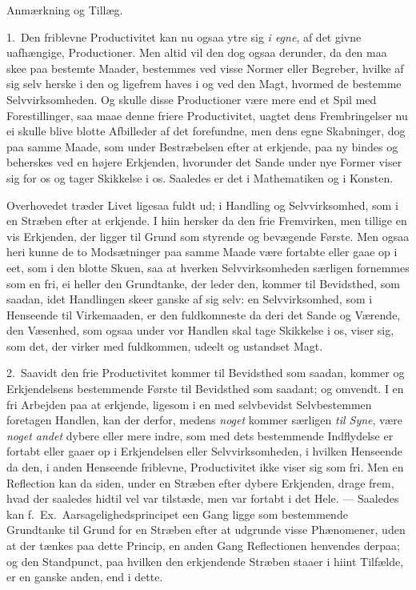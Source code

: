 \documentclass[12pt,a4paper]{book}
\newcommand{\apage}[1]{\marginnote{\footnotesize\textit{[#1]}}}
\begin{document}
\begin{center}Anmærkning og Tillæg.\end{center}

1.~Den friblevne Productivitet kan nu ogsaa ytre sig \emph{i egne}, af det givne
uafhængige, Productioner. Men altid vil den dog ogsaa derunder, da den maa skee
paa bestemte Maader, bestemmes ved visse Normer eller Begreber, hvilke af \apage{31} sig
selv herske i den og ligefrem haves i og ved den Magt, hvormed de bestemme
Selvvirksomheden. Og skulle disse Productioner være mere end et Spil med
Forestillinger, saa maae denne friere Productivitet, uagtet dens Frembringelser
nu ei skulle blive blotte Afbilleder af det forefundne, men dens egne
Skabninger, dog paa samme Maade, som under Bestræbelsen efter at erkjende, paa
ny bindes og beherskes ved en højere Erkjenden, hvorunder det Sande under nye
Former viser sig for os og tager Skikkelse i os. Saaledes er det i Mathematiken
og i Konsten.

Overhovedet træder Livet ligesaa fuldt ud; i Handling og Selvvirksomhed, som i en
Stræben efter at erkjende. I hiin hersker da den frie Fremvirken, men tillige en
vis Erkjenden, der ligger til Grund som styrende og bevægende Første. Men ogsaa
heri kunne de to Modsætninger paa samme Maade være fortabte eller gaae op i eet,
som i den blotte Skuen, saa at hverken Selvvirksomheden særligen fornemmes som en
fri, ei heller den Grundtanke, der leder den, kommer til Bevidsthed, som saadan,
idet Handlingen skeer ganske af sig selv: en Selvvirksomhed, som i Henseende til
Virkemaaden, er den fuldkomneste da deri det Sande og Værende, den Væsenhed, som
ogsaa under vor Handlen skal tage Skikkelse i os, viser sig, som det, der virker
med fuldkommen, udeelt og ustandset Magt.

\apage{32} 2.~Saavidt den frie Productivitet kommer til Bevidsthed som saadan, kommer og
Erkjendelsens bestemmende Første til Bevidsthed som saadant; og omvendt. I en
fri Arbejden paa at erkjende, ligesom i en med selvbevidst Selvbestemmen
foretagen Handlen, kan der derfor, medens \emph{noget} kommer særligen \emph{til
Syne}, være \emph{noget andet} dybere eller mere indre, som med dets bestemmende
Indflydelse er fortabt eller gaaer op i Erkjendelsen eller Selvvirksomheden, i
hvilken Henseende da den, i anden Henseende friblevne, Productivitet ikke viser
sig som fri. Men en Reflection kan da siden, under en Stræben efter dybere
Erkjenden, drage frem, hvad der saaledes hidtil vel var tilstæde, men var
fortabt i det Hele. --- Saaledes kan f.~Ex.\ Aarsagelighedsprincipet een Gang
ligge som bestemmende Grundtanke til Grund for en Stræben efter at udgrunde
visse Phænomener, uden at der tænkes paa dette Princip, en anden Gang
Reflectionen henvendes derpaa; og den Standpunct, paa hvilken den erkjendende
Stræben staaer i hiint Tilfælde, er en ganske anden, end i dette.
\end{document}
